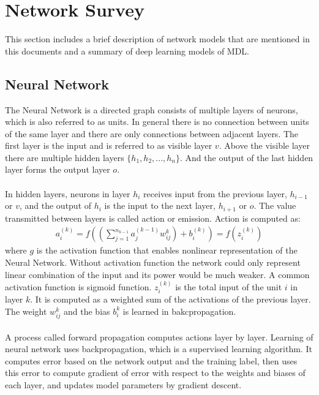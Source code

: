 \documentclass[12pt]{article}
\begin{document}
\section{Network Survey}
This section includes a brief description of network models that are mentioned in this documents and a summary of deep learning models of MDL.
\subsection{Neural Network}
The Neural Network is a directed graph consists of multiple layers of neurons, which is also referred to as units. In general there is no connection between units of the same layer and there are only connections between adjacent layers. The first layer is the input and is referred to as visible layer $v$. Above the visible layer there are multiple hidden layers $\{h_1, h_2,..., h_n\}$. And the output of the last hidden layer forms the output layer $o$.\\
\\
In hidden layers, neurons in layer $h_{i}$ receives input from the previous layer,  $h_{i - 1}$ or $v$, and the output of $h_i$ is the input to the next layer, $h_{i+1}$ or $o$. The value transmitted between layers is called action or emission. Action is computed as:\begin{gather}
a^{(k)}_i = f((\sum_{j=1}^{n_{k-1}}a^{(k-1)}_jw^{k}_{ij})+b^{(k)}_i)=f(z^{(k)}_i)
\end{gather}
where $g$ is the activation function that enables nonlinear representation of the Neural Network. Without activation function the network could only represent linear combination of the input and its power would be much weaker. A common activation function is sigmoid function. $z^{(k)}_i$ is the total input of the unit $i$ in layer $k$. It is computed as a weighted sum of the activations of the previous layer. The weight $w^{k}_{ij}$ and the bias $b^k_i$ is learned in bakcpropagation.\\
\\
A process called forward propagation computes actions layer by layer. Learning of neural network uses backpropagation, which is a supervised learning algorithm. It computes error based on the network output and the training label, then uses this error to compute gradient of error with respect to the weights and biases of each layer, and updates model parameters by gradient descent.
\end{document}
